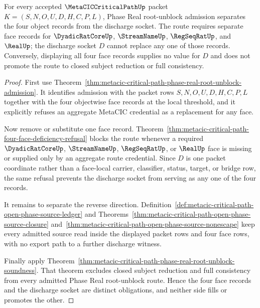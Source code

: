 \begin{theorem}
\label{thm:metacic-critical-path-four-face-socket-separation}
For every accepted $\MetaCICCriticalPathUp$ packet $K=(S,N,O,U,D,H,C,P,L)$, Phase Real root-unblock admission separates the four object records from the discharge socket. The route requires separate face records for $\DyadicRatCoreUp$, $\StreamNameUp$, $\RegSeqRatUp$, and $\RealUp$; the discharge socket $D$ cannot replace any one of those records. Conversely, displaying all four face records supplies no value for $D$ and does not promote the route to closed subject reduction or full consistency.
\end{theorem}
\begin{proof}
First use Theorem~\ref{thm:metacic-critical-path-phase-real-root-unblock-admission}. It identifies admission with the packet rows $S,N,O,U,D,H,C,P,L$ together with the four objectwise face records at the local threshold, and it explicitly refuses an aggregate MetaCIC credential as a replacement for any face.

Now remove or substitute one face record. Theorem~\ref{thm:metacic-critical-path-four-face-deficiency-refusal} blocks the route whenever a required $\DyadicRatCoreUp$, $\StreamNameUp$, $\RegSeqRatUp$, or $\RealUp$ face is missing or supplied only by an aggregate route credential. Since $D$ is one packet coordinate rather than a face-local carrier, classifier, status, target, or bridge row, the same refusal prevents the discharge socket from serving as any one of the four records.

It remains to separate the reverse direction. Definition~\ref{def:metacic-critical-path-open-phase-source-ledger} and Theorems~\ref{thm:metacic-critical-path-open-phase-source-closure} and~\ref{thm:metacic-critical-path-open-phase-source-nonescape} keep every admitted source read inside the displayed packet rows and four face rows, with no export path to a further discharge witness.

Finally apply Theorem~\ref{thm:metacic-critical-path-phase-real-root-unblock-soundness}. That theorem excludes closed subject reduction and full consistency from every admitted Phase Real root-unblock route. Hence the four face records and the discharge socket are distinct obligations, and neither side fills or promotes the other.
\end{proof}
